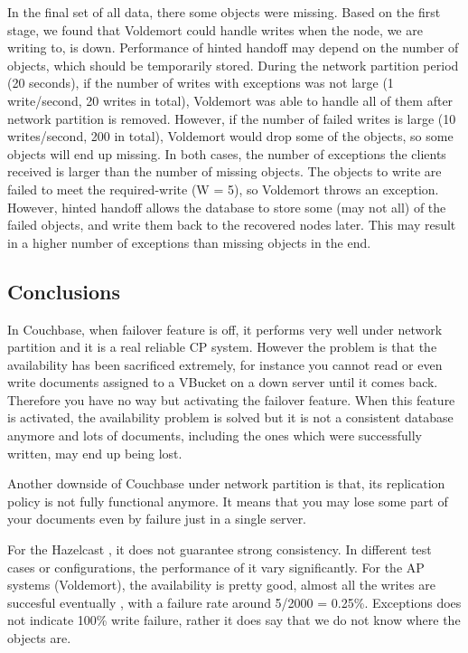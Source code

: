 \documentclass[a4paper]{article}
\begin{document}
In the final set of all data, there some objects were missing. 
Based on the first stage, we found that Voldemort could handle writes when the node, we are writing to, is down. 
Performance of hinted handoff may depend on the number of objects, which should be temporarily stored. 
During the network partition period (20 seconds), if the number of writes with exceptions was not large (1 write/second, 20 writes in total), Voldemort was able to handle all of them after network partition is removed. 
However, if the number of failed writes is large (10 writes/second, 200 in total), Voldemort would drop some of the objects, so some objects will end up missing. 
In both cases, the number of exceptions the clients received is larger than the number of missing objects. 
The objects to write are failed to meet the required-write (W = 5), so Voldemort throws an exception. 
However, hinted handoff allows the database to store some (may not all) of the failed objects, and write them back to the recovered nodes later. 
This may result in a higher number of exceptions than missing objects in the end.

\subsection{Conclusions}

In Couchbase, when failover feature is off, it performs very well under network partition and it is a real reliable CP system.
However the problem is that the availability has been sacrificed extremely, for instance you cannot read or even write documents assigned to a VBucket on a down server until it comes back.
Therefore you have no way but activating the failover feature. 
When this feature is activated, the availability problem is solved but it is not a consistent database anymore and lots of documents, including the ones which were successfully written, may end up being lost. 

Another downside of Couchbase under network partition is that, its replication policy is not fully functional anymore.
It means that you may lose some part of your documents even by failure just in a single server.

For the Hazelcast , it does not guarantee strong consistency. In different test cases or configurations, the performance of it
vary significantly.
For the AP systems (Voldemort), the availability is pretty good, almost all the writes are succesful eventually \cite{werner}, with a failure rate around 5/2000 = 0.25\%.
Exceptions does not indicate 100\% write failure, rather it does say that we do not know where the objects are.
\end{document}
